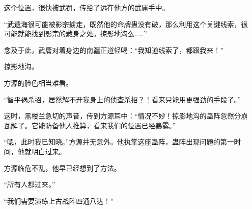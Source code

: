 \begin{this_body}
这个位置，很快被武罚，传给了远在他方的武庸手中。

“武遗海很可能被影宗掳走，既然他的命牌蛊没有破，那么利用这个关键线索，很可能就能找到影宗的藏身之处。掠影地沟么……”

念及于此，武庸对着身边的南疆正道轻喝：“我知道线索了，都跟我来！”

掠影地沟。

方源的脸色相当难看。

“智平祸杀招，居然解不开我身上的侦查杀招？！看来只能用更强劲的手段了。”

这时，黑楼兰急切的声音，传到方源耳中：“情况不妙！掠影地沟的蛊阵忽然分崩瓦解了。它能防备他人推算，看来我们的位置已经暴露。”

“嗯，此时我已知晓。”方源并无意外。他执掌这座蛊阵，蛊阵出现问题的第一时间，他就明白过来。

方源临危不乱，他早已经想到了方法。

“所有人都过来。”

“我们需要演练上古战阵四通八达！”

\end{this_body}

